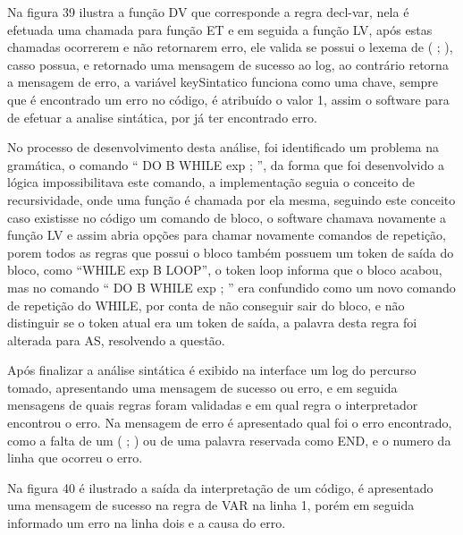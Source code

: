 \documentclass[12pt,oneside,a4paper,chapter=TITLE,section=TITLE,sumario=tradicional]{abntex2}
\begin{document}
Na figura 39 ilustra a função DV que corresponde a regra decl-var, nela é efetuada uma chamada para função ET e em seguida a função LV, após estas chamadas ocorrerem e não retornarem erro, ele valida se possui o lexema de ( ; ), casso possua, e retornado uma mensagem de sucesso ao log, ao contrário retorna a mensagem de erro, a variável keySintatico funciona como uma chave, sempre que é encontrado um erro no código, é atribuído o valor 1, assim o software para de efetuar a analise sintática, por já ter encontrado erro. 

\begin{figure}[htb]
\end{figure} 

No processo de desenvolvimento desta análise, foi identificado um problema na gramática, o comando “ DO B WHILE exp ; ”, da forma que foi desenvolvido a lógica impossibilitava este comando, a implementação seguia o conceito de recursividade, onde uma função é chamada por ela mesma, seguindo este conceito caso existisse no código um comando de bloco, o software chamava novamente a função LV e assim abria opções para chamar novamente comandos de repetição, porem todos as regras que possui o bloco também possuem um token de saída do bloco, como “WHILE exp B LOOP”, o token loop informa que o bloco acabou, mas no comando “ DO B WHILE exp ; ” era confundido como um novo comando de repetição do WHILE, por conta de não conseguir sair do bloco, e não distinguir se o token atual era um token de saída, a palavra desta regra foi alterada para AS, resolvendo a questão.

Após finalizar a análise sintática é exibido na interface um log do percurso tomado, apresentando uma mensagem de sucesso ou erro, e em seguida mensagens de quais regras foram validadas e em qual regra o interpretador encontrou o erro.  Na mensagem de erro é apresentado qual foi o erro encontrado, como a falta de um ( ; ) ou de uma palavra reservada como END, e o numero da linha que ocorreu o erro.

Na figura 40 é ilustrado a saída da interpretação de um código, é apresentado uma mensagem de sucesso na regra de VAR na linha 1, porém em seguida informado um erro na linha dois e a causa do erro.

\begin{figure}[htb]
\end{figure} 
\end{document}

